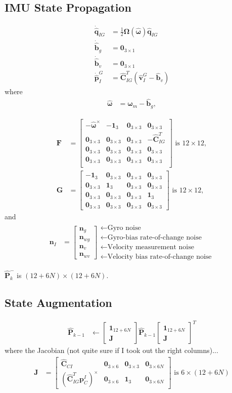 \documentclass[10pt,letterpaper,fleqn,oneside]{article}
\newcommand{\nl}{\\[0.5em]}
\def\Vec#1{\mathbf{#1}} %
\newcommand{\bbm}{\begin{bmatrix}}
\newcommand{\ebm}{\end{bmatrix}}
\begin{document}
\subsection{IMU State Propagation}
\begin{align}
\dot{\hat{\Vec{q}}}_{I G} &= \frac{1}{2}\boldsymbol{\Omega}\left(\hat{\boldsymbol{\omega}} \right)\hat{\Vec{q}}_{I G} \nl
\dot{\hat{\Vec{b}}}_g  &= \Vec{0}_{3\times1} \nl
\dot{\hat{\Vec{b}}}_v &= \Vec{0}_{3\times1} \nl
\dot{\hat{\Vec{p}}}^G_I &= \hat{\Vec{C}}_{I G}^T\left(\hat{\Vec{v}}^G_I - \hat{\Vec{b}}_v \right)
\end{align}
where
\begin{align}
\hat{\boldsymbol{\omega}} &= \boldsymbol{\omega}_m - \hat{\Vec{b}}_g,
\end{align}

\begin{align}
\Vec{F} &= \bbm	-\hat{\boldsymbol{\omega}}^\times & -\Vec{1}_3 & \Vec{0}_{3\times3} & \Vec{0}_{3\times3} \nl
					\Vec{0}_{3\times3} & \Vec{0}_{3\times3} & \Vec{0}_{3\times3} & -\hat{\Vec{C}}_{I G}^T \nl
					\Vec{0}_{3\times3} & \Vec{0}_{3\times3} & \Vec{0}_{3\times3} & \Vec{0}_{3\times3} \nl
					\Vec{0}_{3\times3} & \Vec{0}_{3\times3} & \Vec{0}_{3\times3} & \Vec{0}_{3\times3} \nl
		\ebm \text{ is } 12\times12, \nl
\Vec{G} &= 	\bbm	-\Vec{1}_3 & \Vec{0}_{3\times3} & \Vec{0}_{3\times3} & \Vec{0}_{3\times3} \nl
								\Vec{0}_{3\times3} & \Vec{1}_3 & \Vec{0}_{3\times3} & \Vec{0}_{3\times3} \nl
								\Vec{0}_{3\times3} & \Vec{0}_{3\times3} & \Vec{0}_{3\times3} & \Vec{1}_3 \nl
								\Vec{0}_{3\times3} & \Vec{0}_{3\times3} & \Vec{0}_{3\times3} & \Vec{0}_{3\times3}
					\ebm \text{ is } 12\times12,
\end{align}
and
\begin{align}
\Vec{n}_I &= \bbm \Vec{n}_g \nl \Vec{n}_{wg} \nl \Vec{n}_v \nl \Vec{n}_{wv} \ebm
					\begin{array}{l}
					\leftarrow \text{Gyro noise} \nl
					\leftarrow \text{Gyro-bias rate-of-change noise} \nl
					\leftarrow \text{Velocity measurement noise} \nl
					\leftarrow \text{Velocity bias rate-of-change noise}
					\end{array}		
\end{align}

$\hat{\Vec{P}}^-_k$ is $(12+6N)\times(12+6N)$.

\subsection{State Augmentation}
\begin{align}
\hat{\Vec{P}}_{k-1} &\leftarrow \bbm \Vec{1}_{12+6N}  \nl \Vec{J}\ebm \hat{\Vec{P}}_{k-1} \bbm \Vec{1}_{12+6N}  \nl \Vec{J}\ebm^T
\end{align}
where the Jacobian (not quite sure if I took out the right columns)...
\begin{align}
\Vec{J} &= \bbm \hat{\Vec{C}}_{C I} & \Vec{0}_{3\times6} & \Vec{0}_{3\times3} & \Vec{0}_{3\times6N} \nl
							\left(\hat{\Vec{C}}_{I G}^T \left.\Vec{p}^I_C\right.\right)^\times & \Vec{0}_{3\times6} & \Vec{1}_3 & \Vec{0}_{3\times6N}
				\ebm \text{ is } 6\times\left(12 + 6N\right)
\end{align}
\end{document}
